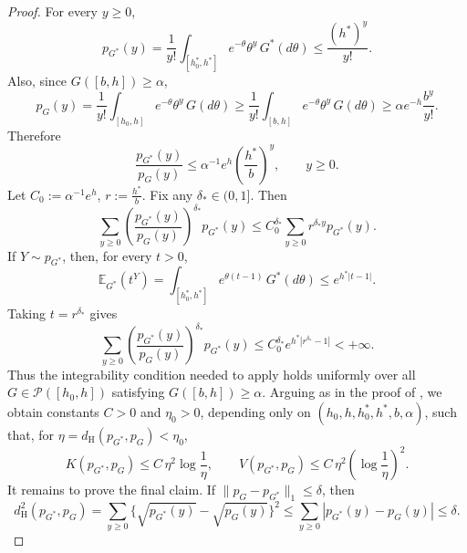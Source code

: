 \documentclass[twoside,12pt]{article}
\begin{document}
\begin{proof}
For every $y\ge 0$,
\begin{displaymath}
p_{G^\ast}(y)=\frac{1}{y!}\int_{[h_{0}^{\ast},h^\ast]} e^{-\theta}\theta^y\,G^\ast(d\theta)\le\frac{(h^\ast)^y}{y!}.
\end{displaymath}
Also, since $G([b,h])\ge \alpha$,
\begin{displaymath}
p_G(y)=\frac{1}{y!}\int_{[h_{0},h]} e^{-\theta}\theta^y\,G(d\theta)\ge\frac{1}{y!}\int_{[b,h]}e^{-\theta}\theta^y\,G(d\theta)\ge\alpha e^{-h}\frac{b^y}{y!}.
\end{displaymath}
Therefore
\begin{displaymath}
\frac{p_{G^\ast}(y)}{p_G(y)}\le\alpha^{-1}e^h\left(\frac{h^\ast}{b}\right)^y,\qquad y\ge 0.
\end{displaymath}
Let $C_0:=\alpha^{-1}e^h$, $r:=\frac{h^\ast}{b}$. Fix any $\delta_\ast\in(0,1]$. Then
\begin{displaymath}
\sum_{y\ge 0}\left(\frac{p_{G^\ast}(y)}{p_G(y)}\right)^{\delta_\ast}p_{G^\ast}(y)\le C_0^{\delta_\ast}\sum_{y\ge 0}r^{\delta_\ast y}p_{G^\ast}(y).
\end{displaymath}
If $Y\sim p_{G^\ast}$, then, for every $t>0$,
\begin{displaymath}
\mathbb E_{G^\ast}(t^Y)=\int_{[h_{0}^{\ast},h^\ast]}e^{\theta(t-1)}\,G^\ast(d\theta)\le e^{h^\ast|t-1|}.
\end{displaymath}
Taking $t=r^{\delta_\ast}$ gives
\begin{displaymath}
\sum_{y\ge 0}\left(\frac{p_{G^\ast}(y)}{p_G(y)}\right)^{\delta_\ast}p_{G^\ast}(y)\le C_0^{\delta_\ast}e^{h^\ast|r^{\delta_\ast}-1|}<+\infty.
\end{displaymath}
Thus the integrability condition needed to apply \citet[Theorem 5]{Won(95)} holds uniformly over all $G\in\mathcal P([h_{0},h])$ satisfying $G([b,h])\ge\alpha$. Arguing as in the proof of \citet[Lemma 4.1]{Gho(01)}, we obtain constants $C>0$ and $\eta_0>0$, depending only on $(h_0,h,h_0^\ast,h^\ast,b,\alpha)$, such that, for $\eta=d_{\mathrm H}(p_{G^\ast},p_G)<\eta_0$,
\begin{displaymath}
K(p_{G^\ast},p_G)\le C\,\eta^2\log\frac{1}{\eta},\qquad V(p_{G^\ast},p_G)\le C\,\eta^2\left(\log\frac{1}{\eta}\right)^2.
\end{displaymath}
It remains to prove the final claim. If $\|p_G-p_{G^\ast}\|_1\le\delta$, then
\begin{displaymath}
d_{\mathrm H}^2(p_{G^\ast},p_G)=\sum_{y\ge 0}\{\sqrt{p_{G^\ast}(y)}-\sqrt{p_G(y)}\}^2\le\sum_{y\ge 0}|p_{G^\ast}(y)-p_G(y)|\le\delta.

\end{displaymath}
\end{proof}
\end{document}
